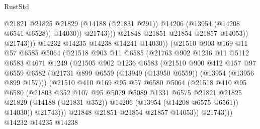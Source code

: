 \begin{lexlean}{RustStd}
\begin{coremodule}
                                    @21821
                                    @21825
                                    @21829
                                    (@14188 (@21831 @291))
                                    @14206
                                    (@13954 (@14208 @6541 @6528))
                                    @14030))
                                @21743)))
                          @21848
                          @21851
                          @21854
                          @21857
                          @14053))
                      @21743)))
                @14232
                @14235
                @14238
                @14241
                @14030))
            (@21510
              @903
              @169
              @11
              @57
              @6585
              @5064
              (@21518
                @903
                @11
                @6585
                (@21763
                  @902
                  @1236
                  @11
                  @5112
                  @6583
                  @4671
                  @1249
                  (@21505
                    @902
                    @1236
                    @6583
                    (@21510
                      @900
                      @412
                      @157
                      @97
                      @6559
                      @6582
                      (@21731 @899 @6559 (@13949 (@13950 @6559)) (@13954 (@13956 @899 @157)))
                      (@21510
                        @410
                        @169
                        @95
                        @57
                        @6580
                        @5064
                        (@21518
                          @410
                          @95
                          @6580
                          (@21803
                            @352
                            @107
                            @95
                            @5079
                            @5089
                            @1331
                            @6575
                            @21821
                            @21825
                            @21829
                            (@14188 (@21831 @352))
                            @14206
                            (@13954 (@14208 @6575 @6561))
                            @14030))
                        @21743)))
                  @21848
                  @21851
                  @21854
                  @21857
                  @14053))
              @21743)))
        @14232
        @14235
        @14238

\end{coremodule}
\end{lexlean}

